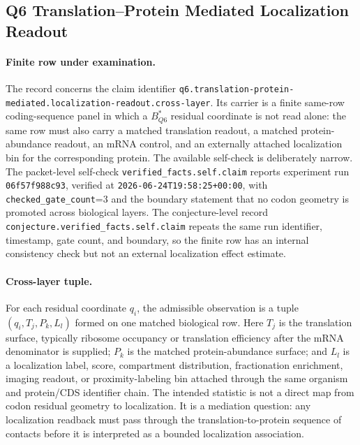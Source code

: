 \subsection{Q6 Translation--Protein Mediated Localization Readout}
\label{subsec:q6-translation-protein-mediated-localization-readout-cross-layer}

\paragraph{Finite row under examination.}
The record concerns the claim identifier \texttt{q6.translation-protein-mediated.localization-readout.cross-layer}.  Its carrier is a finite same-row coding-sequence panel in which a $B^{\ast}_{Q6}$ residual coordinate is not read alone: the same row must also carry a matched translation readout, a matched protein-abundance readout, an mRNA control, and an externally attached localization bin for the corresponding protein.  The available self-check is deliberately narrow.  The packet-level self-check \texttt{verified\_facts.self.claim} reports experiment run \texttt{06f57f988c93}, verified at \texttt{2026-06-24T19:58:25+00:00}, with \texttt{checked\_gate\_count}=3 and the boundary statement that no codon geometry is promoted across biological layers.  The conjecture-level record \texttt{conjecture.verified\_facts.self.claim} repeats the same run identifier, timestamp, gate count, and boundary, so the finite row has an internal consistency check but not an external localization effect estimate.

\paragraph{Cross-layer tuple.}
For each residual coordinate $q_i$, the admissible observation is a tuple $(q_i,T_j,P_k,L_l)$ formed on one matched biological row.  Here $T_j$ is the translation surface, typically ribosome occupancy or translation efficiency after the mRNA denominator is supplied; $P_k$ is the matched protein-abundance surface; and $L_l$ is a localization label, score, compartment distribution, fractionation enrichment, imaging readout, or proximity-labeling bin attached through the same organism and protein/CDS identifier chain.  The intended statistic is not a direct map from codon residual geometry to localization.  It is a mediation question: any localization readback must pass through the translation-to-protein sequence of contacts before it is interpreted as a bounded localization association.

